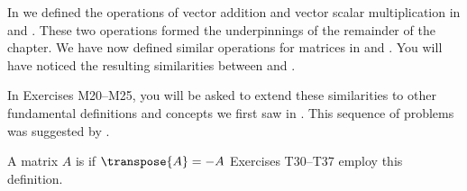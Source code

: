 %
%
\begin{exercisegroup}
\begin{para}In  we defined the operations of vector addition and vector  scalar multiplication in  and .  These two operations formed the underpinnings of the remainder of the chapter.  We have now defined similar operations for matrices in  and .  You will have noticed the resulting similarities between  and .\end{para}
%
\begin{para}In Exercises M20--M25, you will be asked to extend these similarities to other fundamental definitions and concepts we first saw in .  This sequence of problems was suggested by \martinjackson.\end{para}
%
\end{exercisegroup}
%
%
\begin{exercisegroup}
\begin{para}A matrix $A$ is  if $\transpose{A}=-A$  Exercises T30--T37 employ this definition.\end{para}
\end{exercisegroup}






